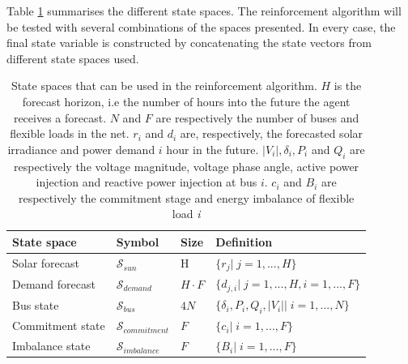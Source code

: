 \documentclass[class=book, crop=false]{standalone}
\begin{document}
Table \ref{table:state_spaces} summarises the different state spaces. The reinforcement algorithm will be tested with several combinations of the spaces presented. In every case, the final state variable is constructed by concatenating the state vectors from different state spaces used. 

\begin{table}[ht]
\centering
\caption{State spaces that can be used in the reinforcement algorithm. $H$ is the forecast horizon, i.e the number of hours into the future the agent receives a forecast. $N$ and $F$ are respectively the number of buses and flexible loads in the net. $r_{i}$ and $d_{i}$ are, respectively, the forecasted solar irradiance and power demand $i$ hour in the future. $|V_{i}|,\delta_{i}, P_{i}$ and $Q_{i}$ are respectively the voltage magnitude, voltage phase angle, active power injection and reactive power injection at bus $i$. $c_{i}$ and $B_{i}$ are respectively the commitment stage and energy imbalance of flexible load \textit{i}}
\label{table:state_spaces}
\begin{tabular}{l|lll}

State space  & Symbol & Size & Definition
\\ 
\hline
Solar forecast      & $\mathcal{S}_{sun}$& H  &  $\{r_{j} |\;j=1,...,H\}$
\\ 

Demand forecast    & $\mathcal{S}_{demand}$ &$H\cdot F$ &$\{d_{j,i} |\;j=1,...,H,i=1,...,F\}$  \\ 
Bus state & $\mathcal{S}_{bus}$ & $4N$ &$\{\delta_{i}, P_{i}, Q_{i}, |V_{i}| |\; i = 1,...,N\}$\\

Commitment state &$\mathcal{S}_{commitment}$& $F$  &$\{ c_{i} |\; i = 1,...,F\}$ \\
 
Imbalance state &$\mathcal{S}_{imbalance}$& $F$  &$\{ B_{i} |\; i = 1,...,F\}$ \\

\hline
\end{tabular}
\end{table}
\end{document}
